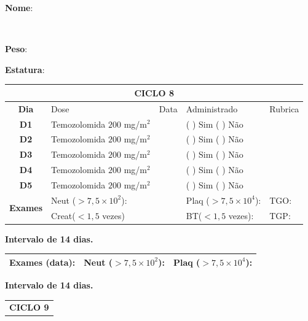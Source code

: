 \documentclass[11pt,a4paper,oldfontcommands]{memoir}
\def\entrywithlabel[#1]#2{\parbox{#1}{{\small #2:} \hrulefill}}
\begin{document}
\begin{center}
\pagebreak
    \noindent
\entrywithlabel[1\hsize]{\textbf{Nome}}\hfill
\\[0.3cm]
\entrywithlabel[.45\hsize]{\textbf{Peso}}\hfill  \entrywithlabel[.45\hsize]{\textbf{Estatura}}

\begin{table}[H]
\begin{tabular}{p{1cm}p{5cm}|p{1cm}|p{4.5cm}|p{2cm}}
	\hline
	\multicolumn{5}{c}{\textbf{CICLO 8}}\\
\hline
    \multicolumn{1}{c|}{\multirow{1}{*}{\textbf{Dia}}}&{Dose}&{Data}&{Administrado}&{Rubrica} \\
    \hline
    \multicolumn{1}{c|}{\multirow{1}{*}{\textbf{D1}}}&{Temozolomida \(200\) mg/m\(^2\)}&&{(  ) Sim (  ) Não}&\\
    \multicolumn{1}{c|}{\multirow{1}{*}{\textbf{D2}}}&{Temozolomida \(200\) mg/m\(^2\)}&&{(  ) Sim (  ) Não}&\\
    \multicolumn{1}{c|}{\multirow{1}{*}{\textbf{D3}}}&{Temozolomida \(200\) mg/m\(^2\)}&&{(  ) Sim (  ) Não}&\\
    \multicolumn{1}{c|}{\multirow{1}{*}{\textbf{D4}}}&{Temozolomida \(200\) mg/m\(^2\)}&&{(  ) Sim (  ) Não}&\\
    \multicolumn{1}{c|}{\multirow{1}{*}{\textbf{D5}}}&{Temozolomida \(200\) mg/m\(^2\)}&&{(  ) Sim (  ) Não}&\\
    \hline
    \multicolumn{1}{c|}{\multirow{2}{*}{\textbf{Exames}}}&\multicolumn{2}{l|}{Neut (\(>7,5\times10^2\)):}&{Plaq (\(>7,5\times10^4\)):}&{TGO:}\\
    \cline{2-5}
    \multicolumn{1}{c|}{\multirow{2}{*}{{}}}&\multicolumn{2}{l|}{Creat(\(<1,5\) vezes)}&{BT(\(<1,5\) vezes):}&{TGP:}
    \\
    \hline
\end{tabular}
\end{table}
\textbf{Intervalo de 14 dias.}
\begin{table}[H]
\begin{tabular}{p{5cm}|p{5cm}|p{4.7cm}}
    \hline
    \textbf{Exames (data):}&{Neut (\(>7,5\times10^2\)):}&{Plaq (\(>7,5\times10^4\)):}
    \\
    \hline
\end{tabular}
\end{table}
\textbf{Intervalo de 14 dias.}
\begin{table}[H]
\begin{tabular}{p{1cm}p{5cm}|p{1cm}|p{4.5cm}|p{2cm}}
	\hline
	\multicolumn{5}{c}{\textbf{CICLO 9}}\\

\end{tabular}
\end{table}
\end{center}
\end{document}
